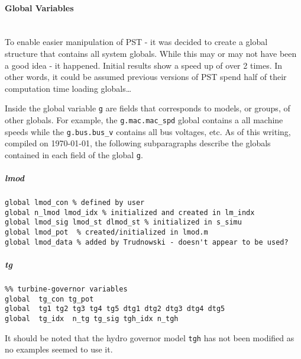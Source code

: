 \documentclass[12pt]{article}
\begin{document}
\pagebreak
\paragraph{Global Variables} \ \\
To enable easier manipulation of PST - it was decided to create a global structure that contains all system globals.
While this may or may not have been a good idea - it happened.
Initial results show a speed up of over 2 times.
In other words, it could be assumed previous versions of PST spend half of their computation time loading globals\ldots


Inside the global variable \verb|g| are fields that corresponds to models, or groups, of other globals.
For example, the \verb|g.mac.mac_spd| global contains a all machine speeds while the \verb|g.bus.bus_v| contains all bus voltages, etc.
As of this writing, compiled on \today, the following subparagraphs describe the globals contained in each field of the global \verb|g|. 

\subparagraph{lmod}
\begin{verbatim}
global lmod_con % defined by user
global n_lmod lmod_idx % initialized and created in lm_indx
global lmod_sig lmod_st dlmod_st % initialized in s_simu
global lmod_pot  % created/initialized in lmod.m 
global lmod_data % added by Trudnowski - doesn't appear to be used?
\end{verbatim}

\subparagraph{tg}
\begin{verbatim}
%% turbine-governor variables
global  tg_con tg_pot
global  tg1 tg2 tg3 tg4 tg5 dtg1 dtg2 dtg3 dtg4 dtg5
global  tg_idx  n_tg tg_sig tgh_idx n_tgh
\end{verbatim}
It should be noted that the hydro governor model \verb|tgh| has not been modified as no examples seemed to use it.
\end{document}

